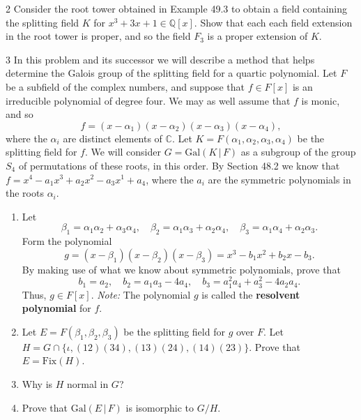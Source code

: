 \begin{problem}{2}
    Consider the root tower obtained in Example 49.3 to obtain a field containing the
    splitting field $K$ for $x^3 + 3x + 1 \in \mathbb{Q}[x]$. Show that each each field
    extension in the root tower is proper, and so the field $F_3$ is a proper extension of
    $K$.
\end{problem}
\unsolved

\begin{problem}{3}
    In this problem and its successor we will describe a method that helps determine the
    Galois group of the splitting field for a quartic polynomial. Let $F$ be a subfield of
    the complex numbers, and suppose that $f \in F[x]$ is an irreducible polynomial of
    degree four. We may as well assume that $f$ is monic, and so
    \[f = (x - \alpha_1)(x - \alpha_2)(x - \alpha_3)(x - \alpha_4),\]
    where the $\alpha_i$ are distinct elements of $\mathbb{C}$. Let
    $K = F(\alpha_1, \alpha_2, \alpha_3, \alpha_4)$ be the splitting field for $f$. We will
    consider $G = \mathrm{Gal}(K \,|\, F)$ as a subgroup of the group $S_4$ of permutations
    of these roots, in this order. By Section 48.2 we know that
    $f = x^4 - a_1x^3 + a_2x^2 - a_3x^1 + a_4$, where the $a_i$ are the symmetric
    polynomials in the roots $\alpha_i$.
    \begin{enumerate}
        \item[(a)] Let
        \[\beta_1 = \alpha_1\alpha_2 + \alpha_3\alpha_4, \quad
          \beta_2 = \alpha_1\alpha_3 + \alpha_2\alpha_4, \quad
          \beta_3 = \alpha_1\alpha_4 + \alpha_2\alpha_3.\]
        Form the polynomial
        \[g = (x - \beta_1)(x - \beta_2)(x - \beta_3) = x^3 - b_1x^2 + b_2x - b_3.\]
        By making use of what we know about symmetric polynomials, prove that
        \[b_1 = a_2, \quad b_2 = a_1a_3 - 4a_4, \quad b_3 = a_1^2a_4 + a_3^2 - 4a_2a_4.\]
        Thus, $g \in F[x]$. \emph{Note:} The polynomial $g$ is called the
        \textbf{resolvent polynomial} for $f$.
        \item[(b)] Let $E = F(\beta_1, \beta_2, \beta_3)$ be the splitting field for $g$
        over $F$. Let $H = G \cap \{\iota, (12)(34), (13)(24), (14)(23)\}$. Prove that
        $E = \mathrm{Fix}(H)$.
        \item[(c)] Why is $H$ normal in $G$?
        \item[(d)] Prove that $\mathrm{Gal}(E \,|\, F)$ is isomorphic to $G/H$.
    \end{enumerate}
\end{problem}
\unsolved

